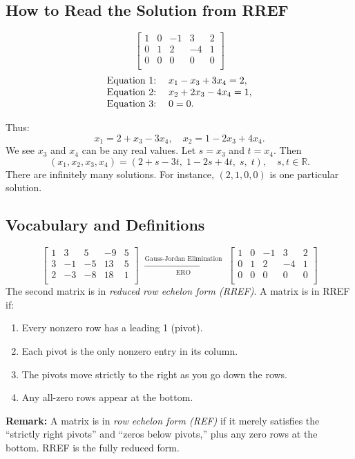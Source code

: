\documentclass[a4paper, 10pt]{article}
\begin{document}
\subsection{How to Read the Solution from RREF}
\[
  \left[\!
    \begin{array}{rrrr|r}
      1 & 0 & -1 & 3  & 2 \\
      0 & 1 & 2  & -4 & 1 \\
      0 & 0 & 0  & 0  & 0 \\
    \end{array}
    \!\right]
\]
\[
  \begin{array}{r@{\;}l}
    \text{Equation 1:} & \quad x_1 - x_3 + 3x_4 = 2,  \\
    \text{Equation 2:} & \quad x_2 + 2x_3 - 4x_4 = 1, \\
    \text{Equation 3:} & \quad 0 = 0.
  \end{array}
\]

Thus:
\[
  x_1 = 2 + x_3 - 3x_4,
  \quad
  x_2 = 1 - 2x_3 + 4x_4.
\]
We see \(x_3\) and \(x_4\) can be any real values. Let \(s = x_3\) and \(t = x_4\). Then
\[
  (x_1, x_2, x_3, x_4)
  =
  (2 + s - 3t,\; 1 - 2s + 4t,\; s,\; t),
  \quad
  s, t \in \mathbb{R}.
\]
There are infinitely many solutions. For instance, \((2,1,0,0)\) is one particular solution.

\subsection{Vocabulary and Definitions}
\[
  \left[\!
    \begin{array}{rrrr|r}
      1 & 3  & 5  & -9 & 5 \\
      3 & -1 & -5 & 13 & 5 \\
      2 & -3 & -8 & 18 & 1 \\
    \end{array}
    \!\right]
  \;\xrightarrow[\text{ERO}]{\text{Gauss-Jordan Elimination}}\;
  \left[\!
    \begin{array}{rrrr|r}
      1 & 0 & -1 & 3  & 2 \\
      0 & 1 & 2  & -4 & 1 \\
      0 & 0 & 0  & 0  & 0 \\
    \end{array}
    \!\right]
\]
The second matrix is in \emph{reduced row echelon form (RREF)}. A matrix is in RREF if:
\begin{enumerate}
  \item Every nonzero row has a leading 1 (pivot).
  \item Each pivot is the only nonzero entry in its column.
  \item The pivots move strictly to the right as you go down the rows.
  \item Any all-zero rows appear at the bottom.
\end{enumerate}
\textbf{Remark:} A matrix is in \emph{row echelon form (REF)} if it merely satisfies the “strictly right pivots” and “zeros below pivots,” plus any zero rows at the bottom. RREF is the fully reduced form.
\end{document}
